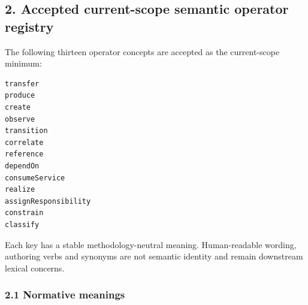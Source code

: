 \documentclass[11pt,a4paper]{article}
\begin{document}
\subsection{2. Accepted current-scope semantic operator registry}\label{accepted-current-scope-semantic-operator-registry}

The following thirteen operator concepts are accepted as the current-scope minimum:

\begin{verbatim}
transfer
produce
create
observe
transition
correlate
reference
dependOn
consumeService
realize
assignResponsibility
constrain
classify
\end{verbatim}

Each key has a stable methodology-neutral meaning. Human-readable wording, authoring verbs and synonyms are not semantic identity and remain downstream lexical concerns.

\subsubsection{2.1 Normative meanings}\label{normative-meanings}
\end{document}
